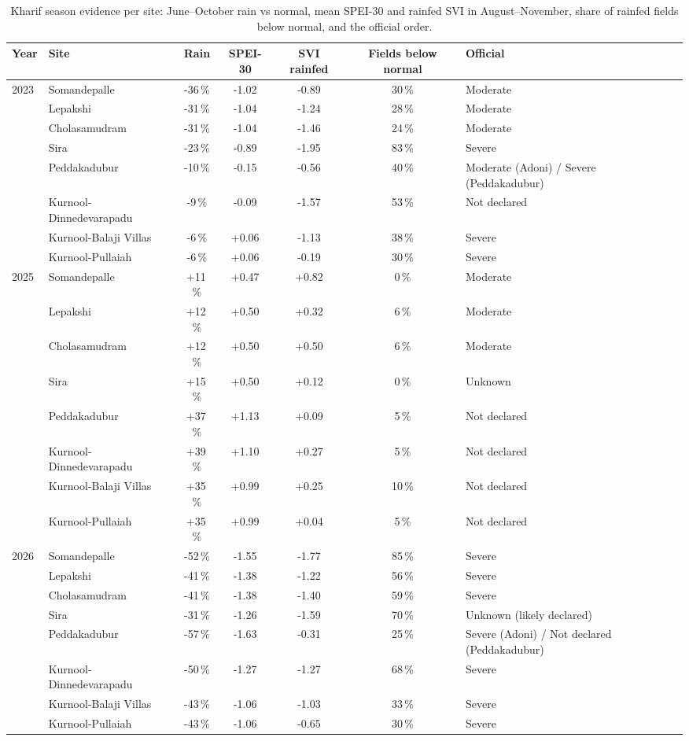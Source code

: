 \begin{table}[H]
\centering
\caption{Kharif season evidence per site: June--October rain vs normal, mean SPEI-30 and rainfed SVI in August--November, share of rainfed fields below normal, and the official order.}
\label{tab:s_seasons}
\scriptsize
\begin{tabular}{@{}llccccl@{}}
\toprule
\textbf{Year} & \textbf{Site} & \textbf{Rain} & \textbf{SPEI-30} & \textbf{SVI rainfed} & \textbf{Fields below normal} & \textbf{Official} \\
\midrule
2023 & Somandepalle & -36\,\% & -1.02 & -0.89 & 30\,\% & Moderate \\
 & Lepakshi & -31\,\% & -1.04 & -1.24 & 28\,\% & Moderate \\
 & Cholasamudram & -31\,\% & -1.04 & -1.46 & 24\,\% & Moderate \\
 & Sira & -23\,\% & -0.89 & -1.95 & 83\,\% & Severe \\
 & Peddakadubur & -10\,\% & -0.15 & -0.56 & 40\,\% & Moderate (Adoni) / Severe (Peddakadubur) \\
 & Kurnool-Dinnedevarapadu & -9\,\% & -0.09 & -1.57 & 53\,\% & Not declared \\
 & Kurnool-Balaji Villas & -6\,\% & +0.06 & -1.13 & 38\,\% & Severe \\
 & Kurnool-Pullaiah & -6\,\% & +0.06 & -0.19 & 30\,\% & Severe \\
\midrule
2025 & Somandepalle & +11\,\% & +0.47 & +0.82 & 0\,\% & Moderate \\
 & Lepakshi & +12\,\% & +0.50 & +0.32 & 6\,\% & Moderate \\
 & Cholasamudram & +12\,\% & +0.50 & +0.50 & 6\,\% & Moderate \\
 & Sira & +15\,\% & +0.50 & +0.12 & 0\,\% & Unknown \\
 & Peddakadubur & +37\,\% & +1.13 & +0.09 & 5\,\% & Not declared \\
 & Kurnool-Dinnedevarapadu & +39\,\% & +1.10 & +0.27 & 5\,\% & Not declared \\
 & Kurnool-Balaji Villas & +35\,\% & +0.99 & +0.25 & 10\,\% & Not declared \\
 & Kurnool-Pullaiah & +35\,\% & +0.99 & +0.04 & 5\,\% & Not declared \\
\midrule
2026 & Somandepalle & -52\,\% & -1.55 & -1.77 & 85\,\% & Severe \\
 & Lepakshi & -41\,\% & -1.38 & -1.22 & 56\,\% & Severe \\
 & Cholasamudram & -41\,\% & -1.38 & -1.40 & 59\,\% & Severe \\
 & Sira & -31\,\% & -1.26 & -1.59 & 70\,\% & Unknown (likely declared) \\
 & Peddakadubur & -57\,\% & -1.63 & -0.31 & 25\,\% & Severe (Adoni) / Not declared (Peddakadubur) \\
 & Kurnool-Dinnedevarapadu & -50\,\% & -1.27 & -1.27 & 68\,\% & Severe \\
 & Kurnool-Balaji Villas & -43\,\% & -1.06 & -1.03 & 33\,\% & Severe \\
 & Kurnool-Pullaiah & -43\,\% & -1.06 & -0.65 & 30\,\% & Severe \\
\bottomrule
\end{tabular}
\end{table}
